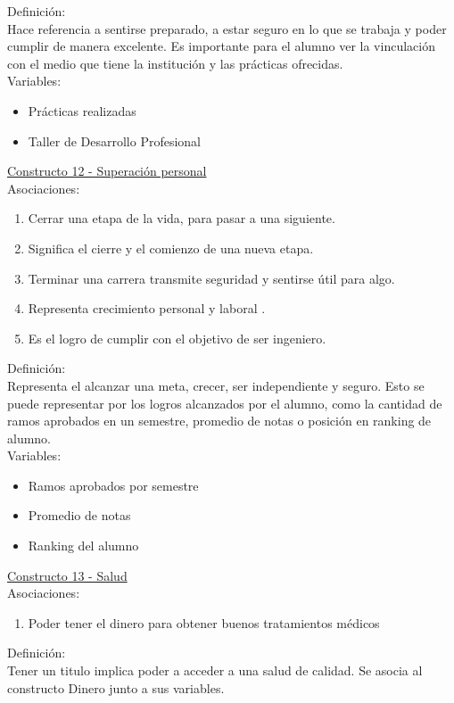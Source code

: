 Definición:\\

Hace referencia a sentirse preparado, a estar seguro en lo que se trabaja y poder cumplir de manera excelente. Es importante para el alumno ver la vinculación con el medio que tiene la institución y las prácticas ofrecidas.\\

Variables:
\begin{itemize}
	\item Prácticas realizadas
	\item Taller de Desarrollo Profesional	
\end{itemize} 

\underline {Constructo 12 - Superación personal} \\
Asociaciones:
\begin{enumerate}
	\item Cerrar una etapa de la vida, para pasar a una siguiente.
	\item Significa el cierre y el comienzo de una nueva etapa.
	\item Terminar una carrera transmite seguridad y sentirse útil para algo.
	\item Representa crecimiento personal y laboral	.
	\item Es el logro de cumplir con el objetivo de ser ingeniero.
\end{enumerate}

Definición:\\
Representa el alcanzar una meta, crecer, ser independiente y seguro. Esto se puede representar por los logros alcanzados por el alumno, como la cantidad de ramos aprobados en un semestre, promedio de notas o posición en ranking de alumno.\\

Variables:
\begin{itemize}
	\item Ramos aprobados por semestre
	\item Promedio de notas
	\item Ranking del alumno	
\end{itemize} 

\underline {Constructo 13 - Salud} \\
Asociaciones:
\begin{enumerate}
	\item Poder tener el dinero para obtener buenos tratamientos médicos		
\end{enumerate}

Definición:\\
Tener un titulo implica poder a acceder a una salud de calidad. Se asocia al constructo Dinero junto a sus variables.\\

